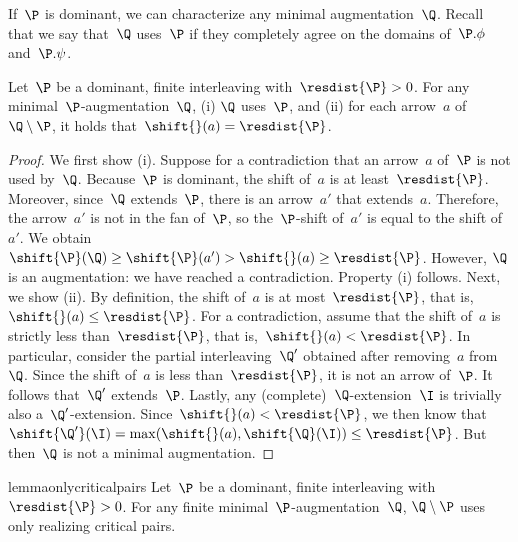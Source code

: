 If~$\P$ is dominant, we can characterize any minimal augmentation~$\Q$.
Recall that we say that~$\Q$ uses~$\P$ if they completely agree on the domains of~$\P.\phi$ and~$\P.\psi$.
%
\begin{lemma}\label{lem:optimal-uses}
Let~$\P$ be a dominant, finite interleaving with~$\resdist{\P} > 0$.
For any minimal~$\P$-augmentation~$\Q$, (i) $\Q$ uses~$\P$, and (ii) for each arrow~$a$ of~$\Q \setminus \P$, it holds that~$\shift{}(a) = \resdist{\P}$.
\end{lemma}
\begin{proof}
We first show (i).
Suppose for a contradiction that an arrow~$a$ of~$\P$ is not used by~$\Q$.
Because~$\P$ is dominant, the shift of~$a$ is at least~$\resdist{\P}$.
Moreover, since~$\Q$ extends~$\P$, there is an arrow~$a'$ that extends~$a$.
Therefore, the arrow~$a'$ is not in the fan of~$\P$, so the~$\P$-shift of~$a'$ is equal to the shift of~$a'$.
We obtain~$\shift{\P}(\Q) \ge \shift{\P}(a') > \shift{}(a) \ge \resdist{\P}$.
However, $\Q$ is an augmentation: we have reached a contradiction.
Property (i) follows.
%
Next, we show (ii).
By definition, the shift of~$a$ is at most~$\resdist{\P}$, that is,~$\shift{}(a) \le \resdist{\P}$.
For a contradiction, assume that the shift of~$a$ is strictly less than~$\resdist{\P}$, that is,~$\shift{}(a) < \resdist{\P}$.
In particular, consider the partial interleaving~$\Q'$ obtained after removing~$a$ from~$\Q$.
Since the shift of~$a$ is less than~$\resdist{\P}$, it is not an arrow of~$\P$.
It follows that~$\Q'$ extends~$\P$.
Lastly, any (complete)~$\Q$-extension~$\I$ is trivially also a~$\Q'$-extension.
Since~$\shift{}(a) < \resdist{\P}$, we then know that~$\shift{\Q'}(\I) = \max(\shift{}(a), \shift{\Q}(\I)) \le \resdist{\P}$.
But then~$\Q$ is not a minimal augmentation.
\end{proof}
%
\begin{restatable}{lemma}{onlycriticalpairs}
\label{lem:only-critical-pairs}
Let~$\P$ be a dominant, finite interleaving with~$\resdist{\P} > 0$.
For any finite minimal~$\P$-augmentation~$\Q$, $\Q \setminus \P$ uses only realizing critical pairs.
\end{restatable}
